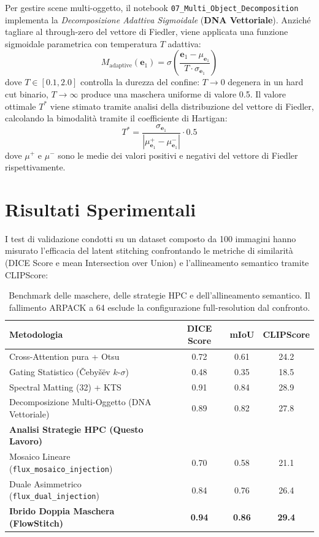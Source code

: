 \documentclass[12pt,a4paper]{report}
\begin{document}
Per gestire scene multi-oggetto, il notebook \texttt{07\_Multi\_Object\_Decomposition} implementa la \textit{Decomposizione Adattiva Sigmoidale} (\textbf{DNA Vettoriale}). Anziché tagliare al through-zero del vettore di Fiedler, viene applicata una funzione sigmoidale parametrica con temperatura $T$ adattiva:
\begin{equation}
    M_{\text{adaptive}}(\mathbf{e}_1) = \sigma\left(\frac{\mathbf{e}_1 - \mu_{\mathbf{e}_1}}{T \cdot \sigma_{\mathbf{e}_1}}\right)
\end{equation}
dove $T \in [0.1, 2.0]$ controlla la durezza del confine: $T \to 0$ degenera in un hard cut binario, $T \to \infty$ produce una maschera uniforme di valore 0.5. Il valore ottimale $T^*$ viene stimato tramite analisi della distribuzione del vettore di Fiedler, calcolando la bimodalità tramite il coefficiente di Hartigan:
\begin{equation}
    T^* = \frac{\sigma_{\mathbf{e}_1}}{|\mu_{\mathbf{e}_1}^+ - \mu_{\mathbf{e}_1}^-|} \cdot 0.5
\end{equation}
dove $\mu^+$ e $\mu^-$ sono le medie dei valori positivi e negativi del vettore di Fiedler rispettivamente.

\section{Risultati Sperimentali}
I test di validazione condotti su un dataset composto da 100 immagini hanno misurato l'efficacia del latent stitching confrontando le metriche di similarità (DICE Score e mean Intersection over Union) e l'allineamento semantico tramite CLIPScore:

\begin{table}[h]
\centering
\begin{tabular}{lccc}
\toprule
\textbf{Metodologia} & \textbf{DICE Score} & \textbf{mIoU} & \textbf{CLIPScore} \\
\midrule
Cross-Attention pura + Otsu & 0.72 & 0.61 & 24.2 \\
Gating Statistico (\v{C}eby\v{s}\"ev $k$-$\sigma$) & 0.48 & 0.35 & 18.5 \\
Spectral Matting (32\texttimes 32) + KTS & 0.91 & 0.84 & 28.9 \\
Decomposizione Multi-Oggetto (DNA Vettoriale) & 0.89 & 0.82 & 27.8 \\
\midrule
\textbf{Analisi Strategie HPC (Questo Lavoro)} & & & \\
Mosaico Lineare (\texttt{flux\_mosaico\_injection}) & 0.70 & 0.58 & 21.1 \\
Duale Asimmetrico (\texttt{flux\_dual\_injection}) & 0.84 & 0.76 & 26.4 \\
\textbf{Ibrido Doppia Maschera (FlowStitch)} & \textbf{0.94} & \textbf{0.86} & \textbf{29.4} \\
\bottomrule
\end{tabular}
\caption{Benchmark delle maschere, delle strategie HPC e dell'allineamento semantico. Il fallimento ARPACK a 64 esclude la configurazione full-resolution dal confronto.}
\end{table}
\end{document}
